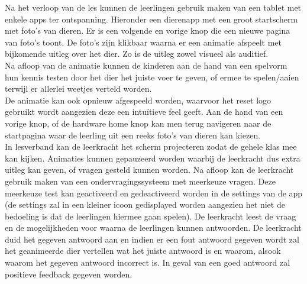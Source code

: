 \documentclass[12pt]{article}
\begin{document}
Na het verloop van de les kunnen de leerlingen gebruik maken van een tablet met enkele apps ter ontspanning. Hieronder een dierenapp met een groot startscherm met foto's van dieren. Er is een volgende en vorige knop die een nieuwe pagina van foto's toont. De foto's zijn klikbaar waarna er een animatie afspeelt met bijkomende uitleg over het dier. Zo is de uitleg zowel visueel als auditief.\\
Na afloop van de animatie kunnen de kinderen aan de hand van een spelvorm hun kennis testen door het dier het juiste voer te geven, of ermee te spelen/aaien terwijl er allerlei weetjes verteld worden.\\
De animatie kan ook opnieuw afgespeeld worden, waarvoor het reset logo gebruikt wordt aangezien deze een intu\"itieve feel geeft. Aan de hand van een vorige knop, of de hardware home knop kan men terug navigeren naar de startpagina waar de leerling uit een reeks foto's van dieren kan kiezen.\\ 
In lesverband kan de leerkracht het scherm projecteren zodat de gehele klas mee kan kijken. Animaties kunnen gepauzeerd worden waarbij de leerkracht dus extra uitleg kan geven, of vragen gesteld kunnen worden. Na afloop kan de leerkracht gebruik maken van een ondervragingssysteem met meerkeuze vragen. Deze meerkeuze test kan geactiveerd en gedeactiveerd worden in de settings van de app (de settings zal in een kleiner icoon gedisplayed worden aangezien het niet de bedoeling is dat de leerlingen hiermee gaan spelen). De leerkracht leest de vraag en de mogelijkheden voor waarna de leerlingen kunnen antwoorden. De leerkracht duid het gegeven antwoord aan en indien er een fout antwoord gegeven wordt zal het geanimeerde dier vertellen wat het juiste antwoord is en waarom, alsook waarom het gegeven antwoord incorrect is. In geval van een goed antwoord zal positieve feedback gegeven worden.

\clearpage
\end{document}
